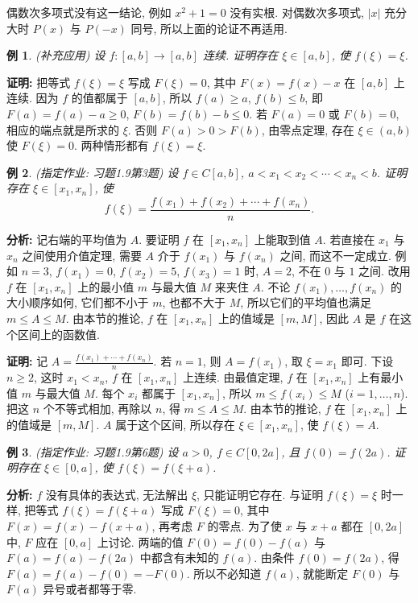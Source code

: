 \documentclass[UTF8,openany]{ctexbook}
\theoremstyle{chinesetextbook}
\newtheorem{example}{例}[section]
\newenvironment{cnproof}{\par\indent\textbf{证明:} \ignorespaces}{\par}
\begin{document}
偶数次多项式没有这一结论, 例如 $x^2+1=0$ 没有实根. 对偶数次多项式, $|x|$ 充分大时 $P(x)$ 与 $P(-x)$ 同号, 所以上面的论证不再适用.
\begin{example}
\textnormal{(补充应用)} 设 $f:[a,b]\to[a,b]$ 连续. 证明存在 $\xi\in[a,b]$, 使 $f(\xi)=\xi$.
\end{example}
\begin{cnproof}
把等式 $f(\xi)=\xi$ 写成 $F(\xi)=0$, 其中 $F(x)=f(x)-x$ 在 $[a,b]$ 上连续. 因为 $f$ 的值都属于 $[a,b]$, 所以 $f(a)\ge a$, $f(b)\le b$, 即 $F(a)=f(a)-a\ge0$, $F(b)=f(b)-b\le0$. 若 $F(a)=0$ 或 $F(b)=0$, 相应的端点就是所求的 $\xi$. 否则 $F(a)>0>F(b)$, 由零点定理, 存在 $\xi\in(a,b)$ 使 $F(\xi)=0$. 两种情形都有 $f(\xi)=\xi$.
\end{cnproof}
\begin{example}
\textnormal{(指定作业: 习题1.9第3题)} 设 $f\in C[a,b]$, $a<x_1<x_2<\cdots<x_n<b$. 证明存在 $\xi\in[x_1,x_n]$, 使
\[
f(\xi)=\frac{f(x_1)+f(x_2)+\cdots+f(x_n)}n.
\]
\end{example}
\par\indent\textbf{分析:} 记右端的平均值为 $A$. 要证明 $f$ 在 $[x_1,x_n]$ 上能取到值 $A$. 若直接在 $x_1$ 与 $x_n$ 之间使用介值定理, 需要 $A$ 介于 $f(x_1)$ 与 $f(x_n)$ 之间, 而这不一定成立. 例如 $n=3$, $f(x_1)=0$, $f(x_2)=5$, $f(x_3)=1$ 时, $A=2$, 不在 $0$ 与 $1$ 之间. 改用 $f$ 在 $[x_1,x_n]$ 上的最小值 $m$ 与最大值 $M$ 来夹住 $A$. 不论 $f(x_1),\ldots,f(x_n)$ 的大小顺序如何, 它们都不小于 $m$, 也都不大于 $M$, 所以它们的平均值也满足 $m\le A\le M$. 由本节的推论, $f$ 在 $[x_1,x_n]$ 上的值域是 $[m,M]$, 因此 $A$ 是 $f$ 在这个区间上的函数值.
\begin{cnproof}
记 $\displaystyle A=\frac{f(x_1)+\cdots+f(x_n)}n$. 若 $n=1$, 则 $A=f(x_1)$, 取 $\xi=x_1$ 即可. 下设 $n\ge2$, 这时 $x_1<x_n$, $f$ 在 $[x_1,x_n]$ 上连续. 由最值定理, $f$ 在 $[x_1,x_n]$ 上有最小值 $m$ 与最大值 $M$. 每个 $x_i$ 都属于 $[x_1,x_n]$, 所以 $m\le f(x_i)\le M$ ($i=1,\ldots,n$). 把这 $n$ 个不等式相加, 再除以 $n$, 得 $m\le A\le M$. 由本节的推论, $f$ 在 $[x_1,x_n]$ 上的值域是 $[m,M]$. $A$ 属于这个区间, 所以存在 $\xi\in[x_1,x_n]$, 使 $f(\xi)=A$.
\end{cnproof}
\begin{example}
\textnormal{(指定作业: 习题1.9第6题)} 设 $a>0$, $f\in C[0,2a]$, 且 $f(0)=f(2a)$. 证明存在 $\xi\in[0,a]$, 使 $f(\xi)=f(\xi+a)$.
\end{example}
\par\indent\textbf{分析:} $f$ 没有具体的表达式, 无法解出 $\xi$, 只能证明它存在. 与证明 $f(\xi)=\xi$ 时一样, 把等式 $f(\xi)=f(\xi+a)$ 写成 $F(\xi)=0$, 其中 $F(x)=f(x)-f(x+a)$, 再考虑 $F$ 的零点. 为了使 $x$ 与 $x+a$ 都在 $[0,2a]$ 中, $F$ 应在 $[0,a]$ 上讨论. 两端的值 $F(0)=f(0)-f(a)$ 与 $F(a)=f(a)-f(2a)$ 中都含有未知的 $f(a)$. 由条件 $f(0)=f(2a)$, 得 $F(a)=f(a)-f(0)=-F(0)$. 所以不必知道 $f(a)$, 就能断定 $F(0)$ 与 $F(a)$ 异号或者都等于零.
\end{document}
